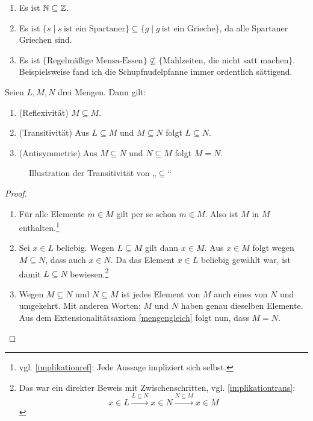\begin{bsp} \quad
    \begin{enumerate}
        \item Es ist $\mathbb N\subseteq \mathbb Z$.
        \item Es ist $\{s\mid s\ \text{ist ein Spartaner}\}\subseteq \{g\mid g\ \text{ist ein Grieche}\}$, da alle Spartaner Griechen sind.
        \item Es ist $\{\text{Regelmäßige Mensa-Essen}\} \nsubseteq \{ \text{Mahlzeiten, die nicht satt machen}\}$. Beispielsweise fand ich die Schupfnudelpfanne immer ordentlich sättigend.
    \end{enumerate}
\end{bsp}


\begin{satz}\label{teilmengeneig}
    Seien $L,M,N$ drei Mengen. Dann gilt:
    \begin{enumerate}
        \item (Reflexivität) $M\subseteq M$.
        \item (Transitivität) Aus $L\subseteq M$ und $M\subseteq N$ folgt $L\subseteq N$.
        \item (Antisymmetrie) Aus $M \subseteq N$ und $N\subseteq M$ folgt $M=N$.
    \end{enumerate}
    \begin{figure}[ht]
        \centering \caption{Illustration der Transitivität von „$\subseteq$“}
    \end{figure}
\end{satz}
\begin{proof}
    \begin{enumerate}
        \item Für alle Elemente $m\in M$ gilt per se schon $m\in M$. Also ist $M$ in $M$ enthalten.\footnote{vgl. \cref{implikationref}: Jede Aussage impliziert sich selbst.}
        \item Sei $x\in L$ beliebig. Wegen $L\subseteq M$ gilt dann $x\in M$. Aus $x\in M$ folgt wegen $M\subseteq N$, dass auch $x\in N$. Da das Element $x\in L$ beliebig gewählt war, ist damit $L\subseteq N$ bewiesen.\footnote{Das war ein direkter Beweis mit Zwischenschritten, vgl. \cref{implikationtrans}:
            \[ x\in L\xrightarrow{L\subseteq N} x\in N \xrightarrow{N\subseteq M} x\in M \]}
        \item Wegen $M\subseteq N$ und $N\subseteq M$ ist jedes Element von $M$ auch eines von $N$ und umgekehrt. Mit anderen Worten: $M$ und $N$ haben genau dieselben Elemente. Aus dem Extensionalitätsaxiom \cref{mengengleich} folgt nun, dass $M=N$. \qedhere
    \end{enumerate}
\end{proof}


